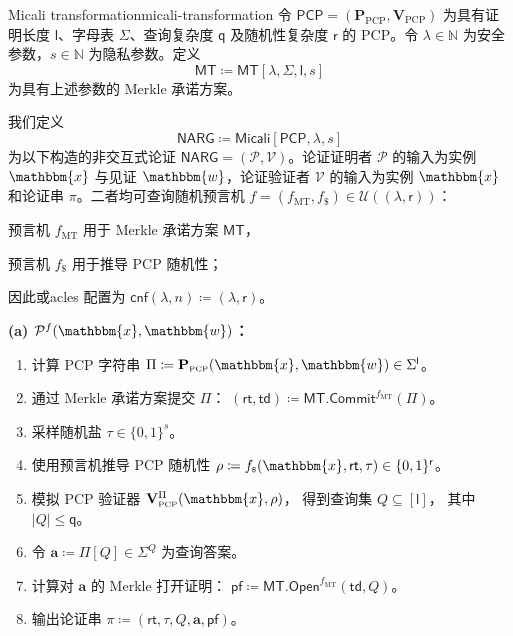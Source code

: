 \documentclass[american,singlepageview]{snargs-book-zh}
\newcommand{\Bits}{\{0,1\}}
\newcommand{\DefineEqual}{\coloneqq}
\renewcommand{\vec}[1]{\bm{#1}}
\newcommand{\Cardinality}[1]{\left|{#1}\right|}
\newcommand{\Naturals}{\mathbb{N}}
\newcommand{\Instance}{\mathbbm{x}}
\newcommand{\Witness}{\mathbbm{w}}
\newcommand{\InstanceSize}{n}
\newcommand{\ProtoProver}{P}
\newcommand{\ProtoVerifier}{V}
\newcommand{\ProtoSalt}{\tau}
\newcommand{\ProtoAlphabet}{\Sigma}
\newcommand{\ProtoProofLength}{\mathsf{l}}
\newcommand{\ProtoQueryComplexity}{\mathsf{q}}
\newcommand{\ProtoRandomnessComplexity}{\mathsf{r}}
\newcommand{\PCPSymbol}{\mathsf{PCP}}
\newcommand{\PCPSubscript}{\scriptscriptstyle\mathrm{PCP}}
\newcommand{\PCPFormat}[1]{\mathbf{#1}}
\newcommand{\PCPProver}{\PCPFormat{\ProtoProver}_{\PCPSubscript}}
\newcommand{\PCPVerifier}{\PCPFormat{\ProtoVerifier}_{\PCPSubscript}}
\newcommand{\PCPSystem}{(\PCPProver,\PCPVerifier)}
\newcommand{\PCPString}{\Pi}
\newcommand{\PCPEntry}{a}
\newcommand{\PCPEntries}{\vec{\PCPEntry}}
\newcommand{\PCPQuerySet}{Q}
\newcommand{\PCPVerifierRandomMessage}{\rho}
\newcommand{\PCPAlphabet}{\ProtoAlphabet}
\newcommand{\PCPProofLength}{\ProtoProofLength}
\newcommand{\PCPRandomnessComplexity}{\ProtoRandomnessComplexity}
\newcommand{\PCPQueryComplexity}{\ProtoQueryComplexity}
\newcommand{\NARGSymbol}{\mathsf{NARG}}
\newcommand{\ARGFormat}[1]{\mathcal{#1}}
\newcommand{\ARGOracles}{\mathsf{cnf}}
\newcommand{\ARGProver}{\ARGFormat{\ProtoProver}}
\newcommand{\ARGVerifier}{\ARGFormat{\ProtoVerifier}}
\newcommand{\ARGSystem}{(\ARGProver,\ARGVerifier)}
\newcommand{\ARGString}{\pi}
\newcommand{\ROFunction}{f}
\newcommand{\RODistribution}[1]{\mathcal{U}(#1)}
\newcommand{\SecurityParameter}{\lambda}
\newcommand{\PrivacyParameter}{s}
\newcommand{\ROTreeSymbol}{\MTSubscript}
\newcommand{\RORandSymbol}{\scriptscriptstyle \mathsf{\$}}
\newcommand{\ROTreeFunction}{\ROFunction_{\ROTreeSymbol}}
\newcommand{\RORandFunction}{\ROFunction_{\RORandSymbol}}
\newcommand{\MTSymbol}{\mathsf{MT}}
\newcommand{\MTSubscript}{{\scriptscriptstyle\mathrm{MT}}}
\newcommand{\MTConstructor}[4]{\MTSymbol[#1,#2,#3,#4]}
\newcommand{\MTCommit}{\MTSymbol.\mathsf{Commit}}
\newcommand{\MTOpen}{\MTSymbol.\mathsf{Open}}
\newcommand{\MTCommitment}{\mathsf{rt}}
\newcommand{\MTTrapdoor}{\mathsf{td}}
\newcommand{\MTProof}{\mathsf{pf}}
\newcommand{\RandSaltString}{\ProtoSalt}
\newcommand{\RandSaltSize}{s}
\newcommand{\FormatTransName}[1]{\bm{\mathsf{#1}}}
\newcommand{\MicaliSymbol}{\FormatTransName{Micali}}
\newcommand{\FormatTransInputs}[3]{[#1,#2,#3]}
\newcommand{\MicaliTransformation}[3]{\MicaliSymbol\FormatTransInputs{#1}{#2}{#3}}
\newcommand{\MicaliText}{Micali transformation\xspace}
\newcommand{\MicaliFSQuery}{(\Instance,\MTCommitment,\RandSaltString)}
\begin{document}
\begin{ImportantConstruction}{\MicaliText}{micali-transformation}
令 $\PCPSymbol=\PCPSystem$ 为具有证明长度 $\PCPProofLength$、字母表 $\PCPAlphabet$、查询复杂度 $\PCPQueryComplexity$ 及随机性复杂度 $\PCPRandomnessComplexity$ 的 PCP。令 $\SecurityParameter\in\Naturals$ 为安全参数，$\PrivacyParameter\in\Naturals$ 为隐私参数。定义
\[
  \MTSymbol \DefineEqual \MTConstructor{\SecurityParameter}{\PCPAlphabet}{\PCPProofLength}{\PrivacyParameter}
\]
为具有上述参数的 Merkle 承诺方案。

我们定义
\[
  \NARGSymbol \DefineEqual \MicaliTransformation{\PCPSymbol}{\SecurityParameter}{\PrivacyParameter}
\]
为以下构造的非交互式论证 $\NARGSymbol=\ARGSystem$。论证证明者 $\ARGProver$ 的输入为实例 $\Instance$ 与见证 $\Witness$，论证验证者 $\ARGVerifier$ 的输入为实例 $\Instance$ 和论证串 $\ARGString$。二者均可查询随机预言机
\(\ROFunction=(\ROTreeFunction,\RORandFunction)\in\RODistribution{(\SecurityParameter,\PCPRandomnessComplexity)}\)：
\begin{inparaenum}[(a)]
  \item 预言机 $\ROTreeFunction$ 用于 Merkle 承诺方案 $\MTSymbol$，
  \item 预言机 $\RORandFunction$ 用于推导 PCP 随机性；
\end{inparaenum}
因此或acles 配置为
\(\ARGOracles(\SecurityParameter,\InstanceSize)\DefineEqual(\SecurityParameter,\PCPRandomnessComplexity)\)。

\medskip

\noindent\textbf{(a) \(\ARGProver^{\ROFunction}(\Instance,\Witness)\)：}
\begin{enumerate}[nolistsep]
  \item 计算 PCP 字符串
    \(\PCPString\DefineEqual\PCPProver(\Instance,\Witness)\in\PCPAlphabet^{\PCPProofLength}\)。
  \item 通过 Merkle 承诺方案提交 $\PCPString$：
    \((\MTCommitment,\MTTrapdoor)\DefineEqual\MTCommit^{\ROTreeFunction}(\PCPString)\)。
  \item 采样随机盐 \(\RandSaltString\in\Bits^{\RandSaltSize}\)。
  \item \label{step:micali-derive-randomness}
    使用预言机推导 PCP 随机性
    \(\PCPVerifierRandomMessage\DefineEqual\RORandFunction\MicaliFSQuery\in\Bits^{\PCPRandomnessComplexity}\)。
  \item 模拟 PCP 验证器
    \(\PCPVerifier^{\PCPString}(\Instance,\PCPVerifierRandomMessage)\)，
    得到查询集 \(\PCPQuerySet\subseteq[\PCPProofLength]\)，
    其中 \(\Cardinality{\PCPQuerySet}\le\PCPQueryComplexity\)。
  \item 令
    \(\PCPEntries\DefineEqual\PCPString[\PCPQuerySet]\in\PCPAlphabet^{\PCPQuerySet}\)
    为查询答案。
  \item 计算对 \(\PCPEntries\) 的 Merkle 打开证明：
    \(\MTProof\DefineEqual\MTOpen^{\ROTreeFunction}(\MTTrapdoor,\PCPQuerySet)\)。
  \item 输出论证串
    \(\ARGString\DefineEqual(\MTCommitment,\RandSaltString,\PCPQuerySet,\PCPEntries,\MTProof)\)。
\end{enumerate}


\end{ImportantConstruction}
\end{document}
